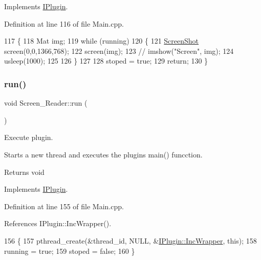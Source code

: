 Implements \hyperlink{class_i_plugin_ab5fdb3b0f7afdcee04324dca01766749}{I\+Plugin}.



Definition at line 116 of file Main.\+cpp.


\begin{DoxyCode}
117 \{
118     Mat img;
119     \textcolor{keywordflow}{while} (running)
120     \{
121         \hyperlink{struct_screen_shot}{ScreenShot} screen(0,0,1366,768);               
122         screen(img);        
123        \textcolor{comment}{// imshow("Screen", img);}
124         usleep(1000);
125         
126     \}
127     
128     stoped = \textcolor{keyword}{true};
129     \textcolor{keywordflow}{return};
130 \}
\end{DoxyCode}
\mbox{\label{class_screen___reader_a9c716b5a3b6f94e1cf89eee7823ecd60}} 
\subsubsection{\texorpdfstring{run()}{run()}}
{\footnotesize\ttfamily void Screen\+\_\+\+Reader\+::run (\begin{DoxyParamCaption}{ }\end{DoxyParamCaption})\hspace{0.3cm}{\ttfamily [virtual]}}



Execute plugin. 

Starts a new thread and executes the plugins main() funcction. \begin{DoxyReturn}{Returns}
void 
\end{DoxyReturn}


Implements \hyperlink{class_i_plugin_a46b4ace767e77f9db9c9585e99c09039}{I\+Plugin}.



Definition at line 155 of file Main.\+cpp.



References I\+Plugin\+::\+Inc\+Wrapper().


\begin{DoxyCode}
156 \{
157     pthread\_create(&thread\_id, NULL, &\hyperlink{class_i_plugin_a62d22be2fdf66eb7f5c2f797f5f3d7f3}{IPlugin::IncWrapper}, \textcolor{keyword}{this});
158     running = \textcolor{keyword}{true};
159     stoped = \textcolor{keyword}{false};
160 \}
\end{DoxyCode}
\mbox{\label{class_screen___reader_a6d211f9c63493fbc1b18fd780f61dcdc}} 
